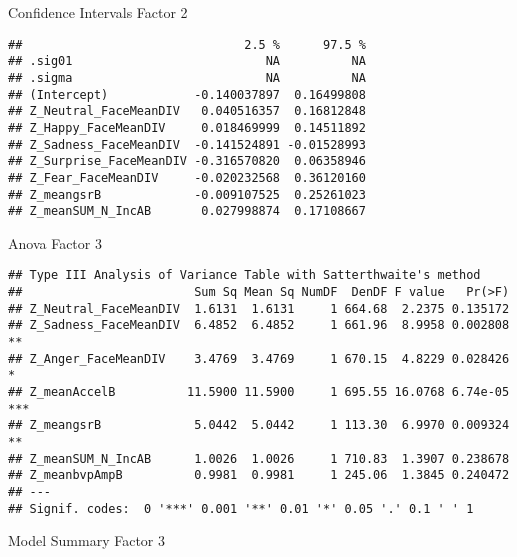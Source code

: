 \documentclass[
]{article}
\begin{document}
Confidence Intervals Factor 2

\begin{verbatim}
##                               2.5 %      97.5 %
## .sig01                           NA          NA
## .sigma                           NA          NA
## (Intercept)            -0.140037897  0.16499808
## Z_Neutral_FaceMeanDIV   0.040516357  0.16812848
## Z_Happy_FaceMeanDIV     0.018469999  0.14511892
## Z_Sadness_FaceMeanDIV  -0.141524891 -0.01528993
## Z_Surprise_FaceMeanDIV -0.316570820  0.06358946
## Z_Fear_FaceMeanDIV     -0.020232568  0.36120160
## Z_meangsrB             -0.009107525  0.25261023
## Z_meanSUM_N_IncAB       0.027998874  0.17108667
\end{verbatim}

Anova Factor 3

\begin{verbatim}
## Type III Analysis of Variance Table with Satterthwaite's method
##                        Sum Sq Mean Sq NumDF  DenDF F value   Pr(>F)    
## Z_Neutral_FaceMeanDIV  1.6131  1.6131     1 664.68  2.2375 0.135172    
## Z_Sadness_FaceMeanDIV  6.4852  6.4852     1 661.96  8.9958 0.002808 ** 
## Z_Anger_FaceMeanDIV    3.4769  3.4769     1 670.15  4.8229 0.028426 *  
## Z_meanAccelB          11.5900 11.5900     1 695.55 16.0768 6.74e-05 ***
## Z_meangsrB             5.0442  5.0442     1 113.30  6.9970 0.009324 ** 
## Z_meanSUM_N_IncAB      1.0026  1.0026     1 710.83  1.3907 0.238678    
## Z_meanbvpAmpB          0.9981  0.9981     1 245.06  1.3845 0.240472    
## ---
## Signif. codes:  0 '***' 0.001 '**' 0.01 '*' 0.05 '.' 0.1 ' ' 1
\end{verbatim}

Model Summary Factor 3
\end{document}
